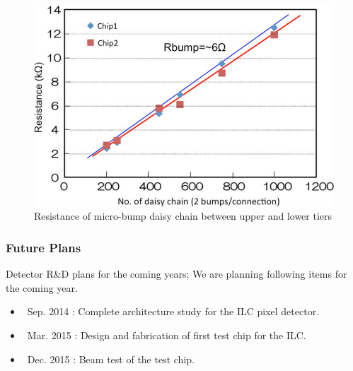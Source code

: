 \begin{figure}
\centering
\includegraphics[width=.5\textwidth]{VertexDetector/SOI/resistanceOfDaisyChain}
\caption{Resistance of micro-bump daisy chain between upper and lower tiers}
\label{fig:VertexDetector:SOI:resistanceOfDaisyChain}
\end{figure}

\subsubsection{Future Plans}
Detector R\&D plans for the coming years;
We are planning following items for the coming year.
\begin{itemize}
\item ~Sep. 2014 : Complete architecture study for the ILC pixel detector.
\item ~Mar. 2015 : Design and fabrication of first test chip for the ILC.
\item ~Dec. 2015 : Beam test of the test chip.
\end{itemize}
